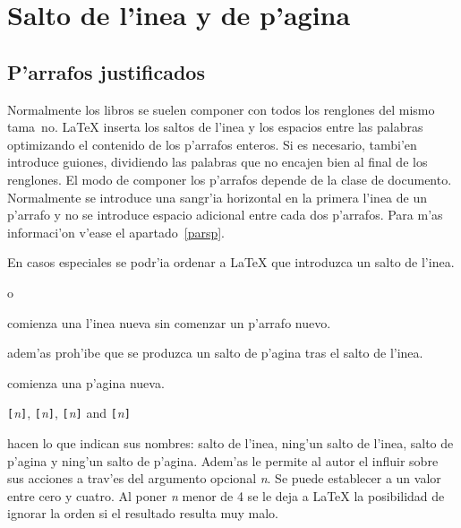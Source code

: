 



\section{Salto de l'inea y de p'agina}

\subsection{P'arrafos justificados}

Normalmente los libros se suelen componer con todos los renglones del
mismo tama~no. \LaTeX{} inserta los saltos de l'inea y los espacios
entre las palabras optimizando el contenido de los p'arrafos enteros.
Si es necesario, tambi'en introduce guiones, dividiendo las palabras
que no encajen bien al final de los renglones. El modo de componer los
p'arrafos depende de la clase de documento. Normalmente se introduce
una sangr'ia horizontal en la primera l'inea de un p'arrafo y no se
introduce espacio adicional entre cada dos p'arrafos. Para m'as
informaci'on v'ease el apartado~\ref{parsp}.

En casos especiales se podr'ia ordenar a \LaTeX{} que introduzca un
salto de l'inea.

\begin{command}
\ci{\bs} o 
\end{command}
\noindent comienza una l'inea nueva sin comenzar un p'arrafo nuevo.

\begin{command}
\ci{\bs*}
\end{command}
\noindent adem'as proh'ibe que se produzca un salto de p'agina tras el
salto de l'inea.

\begin{command}
\end{command}
\noindent comienza una p'agina nueva.
\pagebreak

\begin{command}
\verb|[|\emph{n}\verb|]|,
\verb|[|\emph{n}\verb|]|,
\verb|[|\emph{n}\verb|]| and
\verb|[|\emph{n}\verb|]|
\end{command}
\noindent hacen lo que indican sus nombres: salto de l'inea,
ning'un salto de l'inea, salto de p'agina y ning'un salto de
p'agina. Adem'as le permite al autor el influir sobre sus acciones
a trav'es del argumento opcional \emph{n}. Se puede establecer a
un valor entre cero y cuatro. Al poner \emph{n} menor de 4 se le
deja a \LaTeX{} la posibilidad de ignorar la orden si el resultado
resulta muy malo.

